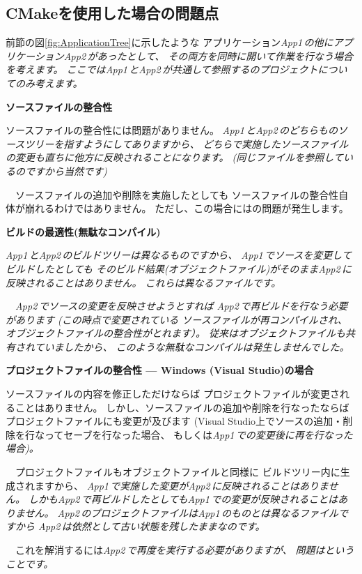 \subsection{CMakeを使用した場合の問題点}
\label{subsec:Problems}

\def\App#1{\it{App#1\,}}
\def\App#1{\it{App#1\,}}

\noindent
前節の図\ref{fig:ApplicationTree}に示したような
アプリケーション\App{1}の他にアプリケーション\App{2}があったとして、
その両方を同時に開いて作業を行なう場合を考えます。
ここでは\App{1}と\App{2}が共通して参照する\SprLib のプロジェクトについてのみ考えます。

\bigskip
\noindent
\bf{ソースファイルの整合性}
\begin{narrow}[20pt]
	ソースファイルの整合性には問題がありません。
	\App{1}と\App{2}のどちらも\SprLib のソースツリーを指すようにしてありますから、
	どちらで実施したソースファイルの変更も直ちに他方に反映されることになります。
	(同じファイルを参照しているのですから当然です)

	　ソースファイルの追加や削除を実施したとしても
	ソースファイルの整合性自体が崩れるわけではありません。
	ただし、この場合にはの問題が発生します。
\end{narrow}

\medskip
\noindent
\bf{ビルドの最適性(無駄なコンパイル)}
\begin{narrow}[20pt]
	\App{1}と\App{2}のビルドツリーは異なるものですから、
	\App{1}でソースを変更してビルドしたとしても
	そのビルド結果(オブジェクトファイル)がそのまま\App{2}に反映されることはありません。
	これらは異なるファイルです。

	　\App{2}でソースの変更を反映させようとすれば
	\App{2}で再ビルドを行なう必要があります (この時点で変更されている
	ソースファイルが再コンパイルされ、オブジェクトファイルの整合性がとれます）。
	従来はオブジェクトファイルも共有されていましたから、
	このような無駄なコンパイルは発生しませんでした。
\end{narrow}

\medskip
\noindent
\bf{プロジェクトファイルの整合性 --- Windows (Visual Studio)の場合}
\begin{narrow}[20pt]
	ソースファイルの内容を修正しただけならば
	プロジェクトファイルが変更されることはありません。
	しかし、ソースファイルの追加や削除を行なったならば
	プロジェクトファイルにも変更が及びます
	(Visual Studio上でソースの追加・削除を行なってセーブを行なった場合、
	もしくは\App{1}での変更後に再\cmake を行なった場合)。

	　プロジェクトファイルもオブジェクトファイルと同様に
	ビルドツリー内に生成されますから、
	\App{1}で実施した変更が\App{2}に反映されることはありません。
	しかも\App{2}で再ビルドしたとしても\App{1}での変更が反映されることはありません。
	\App{2}のプロジェクトファイルは\App{1}のものとは異なるファイルですから
	\App{2}は依然として古い状態を残したままなのです。

	\indent
	　これを解消するには\App{2}で再度\cmake を実行する必要がありますが、
	問題はということです。
\end{narrow}

